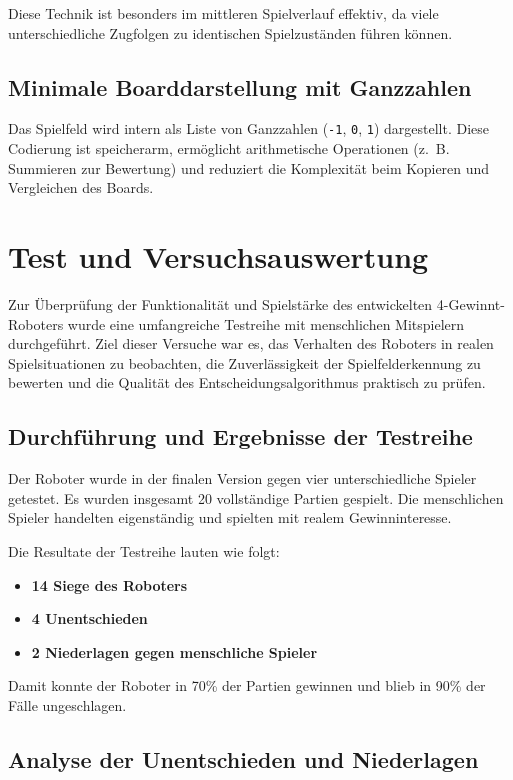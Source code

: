 Diese Technik ist besonders im mittleren Spielverlauf effektiv, da viele unterschiedliche Zugfolgen zu identischen Spielzuständen führen können.

\subsection{Minimale Boarddarstellung mit Ganzzahlen}

Das Spielfeld wird intern als Liste von Ganzzahlen (\texttt{-1}, \texttt{0}, \texttt{1}) dargestellt. Diese Codierung ist speicherarm, ermöglicht arithmetische Operationen (z.~B. Summieren zur Bewertung) und reduziert die Komplexität beim Kopieren und Vergleichen des Boards.

\section{Test und Versuchsauswertung}

Zur Überprüfung der Funktionalität und Spielstärke des entwickelten 4-Gewinnt-Roboters wurde eine umfangreiche Testreihe mit menschlichen Mitspielern durchgeführt. Ziel dieser Versuche war es, das Verhalten des Roboters in realen Spielsituationen zu beobachten, die Zuverlässigkeit der Spielfelderkennung zu bewerten und die Qualität des Entscheidungsalgorithmus praktisch zu prüfen.

\subsection{Durchführung und Ergebnisse der Testreihe}

Der Roboter wurde in der finalen Version gegen vier unterschiedliche Spieler getestet. 
Es wurden insgesamt 20 vollständige Partien gespielt. Die menschlichen Spieler handelten eigenständig und spielten mit realem Gewinninteresse.

Die Resultate der Testreihe lauten wie folgt:

\begin{itemize}
	\item \textbf{14 Siege des Roboters}
	\item \textbf{4 Unentschieden}
	\item \textbf{2 Niederlagen gegen menschliche Spieler}
\end{itemize}

Damit konnte der Roboter in 70\% der Partien gewinnen und blieb in 90\% der Fälle ungeschlagen.
\newpage

\subsection{Analyse der Unentschieden und Niederlagen}

